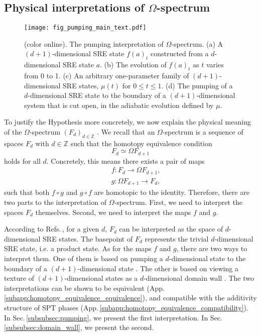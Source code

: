 \documentclass[sort&compress]{elsarticle}
\theoremstyle{theoremstyle}
\theoremstyle{framedtheoremstyle}
\theoremstyle{definitionstyle}
\theoremstyle{definitionstyle}
\theoremstyle{definitionstyle}
\theoremstyle{definitionstyle}
\theoremstyle{nameddefinitionstyle}
\theoremstyle{framednameddefinitionstyle}
\theoremstyle{proofstyle}
\theoremstyle{definitionstyle}
\newcommand{\fromto}{\rightarrow}
\newcommand{\ZZZ}{\mathbb{Z}}
\newcommand{\homotopic}{\simeq}
\begin{document}
\subsection{Physical interpretations of $\Omega$-spectrum\label{subsec:physical_interpretations_Omega_spectrum}}

\begin{figure}
\centering
\texttt{[image: fig\_pumping\_main\_text.pdf]}
\caption{(color online). The pumping interpretation of $\Omega$-spectrum. (a) A $(d+1)$-dimensional SRE state $f(a)_t$ constructed from a $d$-dimensional SRE state $a$. (b) The evolution of $f(a)_t$ as $t$ varies from 0 to 1. (c) An arbitrary one-parameter family of $(d+1)$-dimensional SRE states, $\mu(t)$ for $0 \leq t \leq 1$. (d) The pumping of a $d$-dimensional SRE state to the boundary of a $(d+1)$-dimensional system that is cut open, in the adiabatic evolution defined by $\mu$.}
\label{fig:pumping}
\end{figure}

To justify the Hypothesis more concretely, we now explain the physical meaning of the $\Omega$-spectrum $(F_d)_{d\in \ZZZ}$ \cite{Kitaev_Stony_Brook_2011_SRE_1, Kitaev_Stony_Brook_2013_SRE, Kitaev_IPAM}. We recall that an $\Omega$-spectrum is a sequence of spaces $F_d$ with $d\in \ZZZ$ such that the homotopy equivalence condition
\begin{equation}
F_d \homotopic \Omega F_{d+1}
\end{equation}
holds for all $d$. Concretely, this means there exists a pair of maps
\begin{eqnarray}
&&f: F_d \fromto \Omega F_{d+1}, \\
&&g: \Omega F_{d+1} \fromto F_d,
\end{eqnarray}
such that both $f \circ g$ and $g \circ f$ are homotopic to the identity. Therefore, there are two parts to the interpretation of $\Omega$-spectrum. First, we need to interpret the spaces $F_d$ themselves. Second, we need to interpret the maps $f$ and $g$.

According to Refs.\,\cite{Kitaev_Stony_Brook_2011_SRE_1, Kitaev_Stony_Brook_2013_SRE, Kitaev_IPAM}, for a given $d$, $F_d$ can be interpreted as the space of $d$-dimensional SRE states. The basepoint of $F_d$ represents the trivial $d$-dimensional SRE state, i.e. a product state. As for the maps $f$ and $g$, there are two ways to interpret them. One of them is based on pumping a $d$-dimensional state to the boundary of a $(d+1)$-dimensional state \cite{Kitaev_Stony_Brook_2011_SRE_1, Kitaev_Stony_Brook_2013_SRE}. The other is based on viewing a texture of $(d+1)$-dimensional states as a $d$-dimensional domain wall \cite{Kitaev_IPAM}. The two interpretations can be shown to be equivalent (App.\,\ref{subapp:homotopy_equivalence_equivalence}), and compatible with the additivity structure of SPT phases (App.\,\ref{subapp:homotopy_equivalence_compatibility}). In Sec.\,\ref{subsubsec:pumping}, we present the first interpretation. In Sec.\,\ref{subsubsec:domain_wall}, we present the second.
\end{document}
